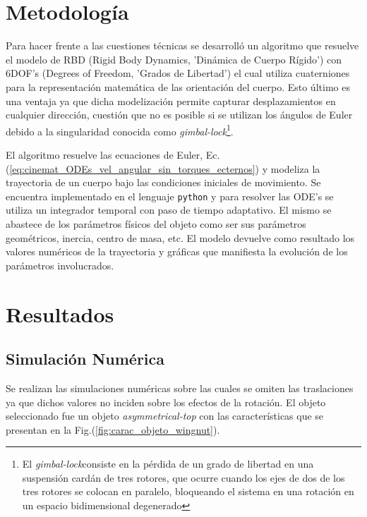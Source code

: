 \documentclass[oneside,a4paper,english,links]{amca}
\begin{document}
\section{Metodología}
\label{sec:metodologia}

Para  hacer frente a las cuestiones t\'ecnicas se desarroll\'o un algoritmo que resuelve el modelo de RBD (Rigid Body Dynamics, 'Din\'amica de Cuerpo R\'igido') con 6DOF's (Degrees of Freedom, 'Grados de Libertad') el cual utiliza cuaterniones para la representaci\'on matem\'atica de las orientaci\'on del cuerpo. Esto \'ultimo es una ventaja ya que dicha modelizaci\'on permite capturar desplazamientos en cualquier direcci\'on, cuesti\'on que no es posible si se utilizan los \'angulos de Euler debido a la singularidad conocida como \textit{gimbal-lock}\footnote{El \textit{gimbal-lock}consiste en la pérdida de un grado de libertad en una suspensión cardán de tres rotores, que ocurre cuando los ejes de dos de los tres rotores se colocan en paralelo, bloqueando el sistema en una rotación en un espacio bidimensional degenerado}.

El algoritmo resuelve las ecuaciones de Euler, Ec.(\ref{eq:cinemat_ODEs_vel_angular_sin_torques_ecternos}) y modeliza la trayectoria de un cuerpo bajo las condiciones iniciales de movimiento. Se encuentra implementado en el lenguaje \texttt{python} y para resolver las ODE's se utiliza un integrador temporal con paso de tiempo adaptativo. El mismo se abastece de los par\'ametros f\'isicos del objeto como ser sus par\'ametros geom\'etricos, inercia, centro de masa, etc. El modelo devuelve como resultado los valores num\'ericos de la trayectoria y gr\'aficas que manifiesta la evoluci\'on de los par\'ametros involucrados.



\section{Resultados}
\label{sec:resultados}

\subsection{Simulaci\'on Num\'erica}

Se realizan las simulaciones num\'ericas sobre las cuales se omiten las traslaciones ya que dichos valores no inciden sobre los efectos de la rotaci\'on. El objeto seleccionado fue un objeto \textit{asymmetrical-top} con las caracter\'isticas que se presentan en la Fig.(\ref{fig:carac_objeto_wingnut}).
\end{document}
